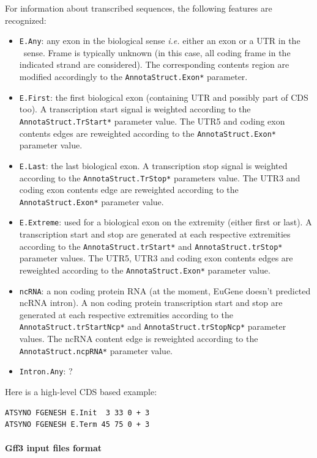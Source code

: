 For information about transcribed sequences, the following features
are recognized:
\begin{itemize}
\item \texttt{E.Any}: any exon in the biological sense \textit{i.e.}
  either an exon or a UTR in the \EuGene\ sense. Frame is typically
  unknown (in this case, all coding frame in the indicated strand are
  considered). The corresponding contents region are modified
  accordingly to the \texttt{AnnotaStruct.Exon*} parameter.
\item \texttt{E.First}: the first biological exon (containing UTR and
  possibly part of CDS too). A transcription start signal is weighted
  according to the \texttt{AnnotaStruct.TrStart*} parameter value. The
  UTR5 and coding exon contents edges are reweighted according to the
  \texttt{AnnotaStruct.Exon*} parameter value.
\item \texttt{E.Last}: the last biological exon. A transcription stop
  signal is weighted according to the \texttt{Annota\-Struct.TrStop*}
  parameters value. The UTR3 and coding exon contents edge are
  reweighted according to the \texttt{AnnotaStruct.Exon*} parameter
  value.
\item \texttt{E.Extreme}: used for a biological exon on the extremity
  (either first or last).  A transcription start and stop are
  generated at each respective extremities according to the
  \texttt{AnnotaStruct.trStart*} and \texttt{AnnotaStruct.trStop*}
  parameter values. The UTR5, UTR3 and coding exon contents edges are
  reweighted according to the \texttt{AnnotaStruct.Exon*} parameter
  value.
\item \texttt{ncRNA}: a non coding protein RNA (at the moment, EuGene doesn't 
predicted ncRNA intron). A non coding protein transcription start and stop are
  generated at each respective extremities according to the
  \texttt{AnnotaStruct.trStartNcp*} and \texttt{AnnotaStruct.trStopNcp*}
  parameter values. The ncRNA content edge is
  reweighted according to the \texttt{AnnotaStruct.ncpRNA*} parameter
  value.
\item \texttt{Intron.Any}: ?
\end{itemize}


Here is a high-level CDS based example:
\begin{Verbatim}[fontsize=\small]
ATSYNO FGENESH E.Init  3 33 0 + 3
ATSYNO FGENESH E.Term 45 75 0 + 3
\end{Verbatim}

\paragraph{Gff3 input files format}

